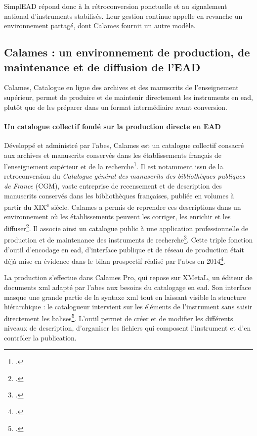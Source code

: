 SimplEAD répond donc à la rétroconversion ponctuelle et au \gls{signalement} national d'instruments stabilisés. Leur gestion continue appelle en revanche un environnement partagé, dont Calames fournit un autre modèle.

\subsection{Calames : un environnement de production, de maintenance et de diffusion de l'EAD}
\label{subsec:calames}

Calames, Catalogue en ligne des archives et des manuscrits de l'enseignement supérieur, permet de produire et de maintenir directement les instruments en \gls{ead}, plutôt que de les préparer dans un format intermédiaire avant conversion.

\paragraph{Un catalogue collectif fondé sur la production directe en EAD}

Développé et administré par l'\Gls{abes}, Calames est un catalogue collectif consacré aux archives et manuscrits conservés dans les établissements français de l'enseignement supérieur et de la recherche\footcite{ABESCatalogueCalames}. Il est notamment issu de la \gls{retroconversion} du \textit{Catalogue général des manuscrits des bibliothèques publiques de France} (CGM), vaste entreprise de recensement et de description des manuscrits conservés dans les bibliothèques françaises, publiée en volumes à partir du XIX\textsuperscript{e} siècle. Calames a permis de reprendre ces descriptions dans un environnement où les établissements peuvent les corriger, les enrichir et les diffuser\footcite{Nicolas2007}. Il associe ainsi un catalogue public à une application professionnelle de production et de maintenance des instruments de recherche\footcite{Nicolas2008CalamesCatalogage}. Cette triple fonction d'outil d'encodage en \gls{ead}, d'interface publique et de réseau de production était déjà mise en évidence dans le bilan prospectif réalisé par l'\Gls{abes} en 2014\footcite{ABESCalamesBilan2014}.

La production s'effectue dans Calames Pro, qui repose sur XMetaL, un éditeur de documents \gls{xml} adapté par l'\Gls{abes} aux besoins du catalogage en \gls{ead}. Son interface masque une grande partie de la syntaxe \gls{xml} tout en laissant visible la structure hiérarchique : le catalogueur intervient sur les éléments de l'instrument sans saisir directement les balises\footcite{Nicolas2008CalamesCatalogage}. L'outil permet de créer et de modifier les différents niveaux de description, d'organiser les fichiers qui composent l'instrument et d'en contrôler la publication.

